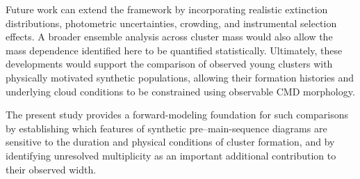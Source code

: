 \documentclass[linenumbers, twocolumn]{aastex631}
\begin{document}
Future work can extend the framework by incorporating realistic extinction distributions, photometric uncertainties, crowding, and instrumental selection effects. A broader ensemble analysis across cluster mass would also allow the mass dependence identified here to be quantified statistically. Ultimately, these developments would support the comparison of observed young clusters with physically motivated synthetic populations, allowing their formation histories and underlying cloud conditions to be constrained using observable CMD morphology.

The present study provides a forward-modeling foundation for such comparisons by establishing which features of synthetic pre--main-sequence diagrams are sensitive to the duration and physical conditions of cluster formation, and by identifying unresolved multiplicity as an important additional contribution to their observed width.

\begin{acknowledgments}

\end{acknowledgments}

%


\end{document}
